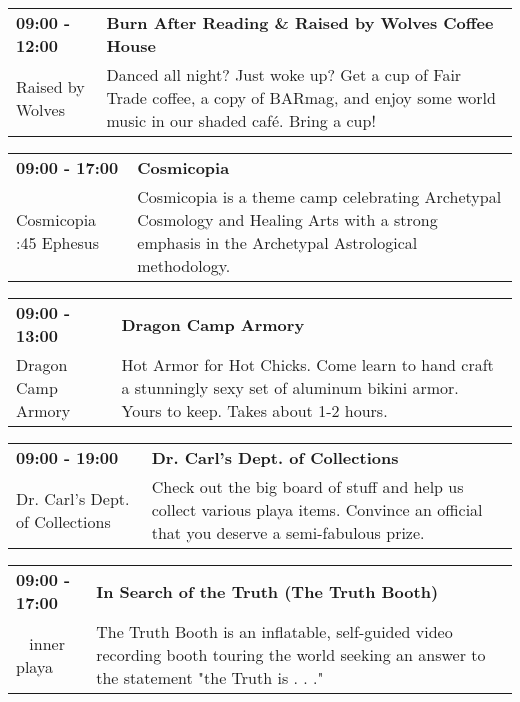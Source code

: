 \begin{tabular}{ p{1in} p{2.2in} }
    \textbf{09:00 - 12:00} & \textbf{Burn After Reading \& Raised by Wolves Coffee House} \\
    Raised by Wolves \newline  & Danced all night? Just woke up? Get a cup of Fair Trade coffee, a copy of BARmag, and enjoy some world music in our shaded caf\'e. Bring a cup! \\
    \hline 
\end{tabular}
    
\begin{tabular}{ p{1in} p{2.2in} }
    \textbf{09:00 - 17:00} & \textbf{Cosmicopia} \\
    Cosmicopia \newline 3:45 Ephesus & Cosmicopia is a theme camp celebrating Archetypal Cosmology and Healing Arts with a strong emphasis in the Archetypal Astrological methodology. \\
    \hline 
\end{tabular}
    
\begin{tabular}{ p{1in} p{2.2in} }
    \textbf{09:00 - 13:00} & \textbf{Dragon Camp Armory} \\
    Dragon Camp Armory \newline  & Hot Armor for Hot Chicks. Come learn to hand craft a stunningly sexy set of aluminum bikini armor. Yours to keep. Takes about 1-2 hours. \\
    \hline 
\end{tabular}
    
\begin{tabular}{ p{1in} p{2.2in} }
    \textbf{09:00 - 19:00} & \textbf{Dr. Carl's Dept. of Collections} \\
    Dr. Carl's Dept. of Collections \newline  & Check out the big board of stuff and help us collect various playa items. Convince an official that you deserve a semi-fabulous prize. \\
    \hline 
\end{tabular}
    
\begin{tabular}{ p{1in} p{2.2in} }
    \textbf{09:00 - 17:00} & \textbf{In Search of the Truth (The Truth Booth)} \\
    ~ \newline inner playa & The Truth Booth is an inflatable, self-guided video recording booth touring the world seeking an answer to the statement "the Truth is . . ." \\
    \hline 
\end{tabular}
    
